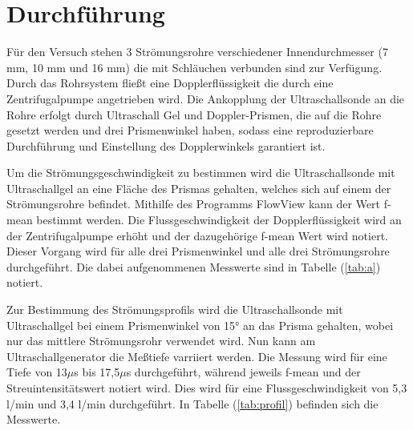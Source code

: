 \section{Durchführung}
Für den Versuch stehen 3 Strömungsrohre verschiedener Innendurchmesser (7 mm, 10 mm und 16 mm) die mit Schläuchen verbunden sind zur Verfügung.
Durch das Rohrsystem fließt eine Dopplerflüssigkeit die durch eine Zentrifugalpumpe angetrieben wird.
Die Ankopplung der Ultraschallsonde an die Rohre erfolgt durch Ultraschall Gel und Doppler-Prismen, die auf die Rohre gesetzt werden
und drei Prismenwinkel haben, sodass eine reproduzierbare Durchführung und Einstellung des Dopplerwinkels garantiert ist.

\noindent
Um die Strömungsgeschwindigkeit zu bestimmen wird die Ultraschallsonde mit Ultraschallgel an eine Fläche des Prismas gehalten, 
welches sich auf einem der Strömungsrohre befindet.
Mithilfe des Programms FlowView kann der Wert f-mean bestimmt werden.
Die Flussgeschwindigkeit der Dopplerflüssigkeit wird an der Zentrifugalpumpe erhöht und der dazugehörige f-mean Wert wird notiert.
Dieser Vorgang wird für alle drei Prismenwinkel und alle drei Strömungsrohre durchgeführt.
Die dabei aufgenommenen Messwerte sind in Tabelle (\ref{tab:a}) notiert.

\noindent
Zur Bestimmung des Strömungsprofils wird die Ultraschallsonde mit Ultraschallgel bei einem Prismenwinkel von 15° an das Prisma gehalten, 
wobei nur das mittlere Strömungsrohr verwendet wird.
Nun kann am Ultraschallgenerator die Meßtiefe varriiert werden.
Die Messung wird für eine Tiefe von 13$\mu$s bis 17,5$\mu$s durchgeführt, 
während jeweils f-mean und der Streuintensitätswert notiert wird.
Dies wird für eine Flussgeschwindigkeit von 5,3 l/min und 3,4 l/min durchgeführt.
In Tabelle (\ref{tab:profil})
befinden sich die Messwerte.
